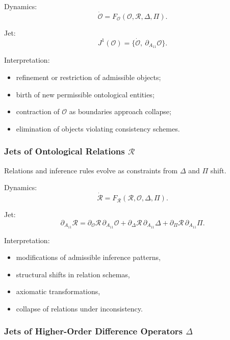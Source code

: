 Dynamics:
\[
\dot{\mathcal{O}}
=
F_{\mathcal{O}}(\mathcal{O},\mathcal{R},\Delta,\Pi).
\]

Jet:
\[
J^1(\mathcal{O})=\{\dot{\mathcal{O}},\ \partial_{A_{11}}\mathcal{O}\}.
\]

Interpretation:
\begin{itemize}
    \item refinement or restriction of admissible objects;
    \item birth of new permissible ontological entities;
    \item contraction of $\mathcal{O}$ as boundaries approach collapse;
    \item elimination of objects violating consistency schemes.
\end{itemize}


\subsubsection{Jets of Ontological Relations $\mathcal{R}$}

Relations and inference rules evolve as constraints from
$\Delta$ and $\Pi$ shift.

Dynamics:
\[
\dot{\mathcal{R}}
=
F_{\mathcal{R}}(\mathcal{R},\mathcal{O},\Delta,\Pi).
\]

Jet:
\[
\partial_{A_{11}}\mathcal{R}
=
\partial_{\mathcal{O}}\mathcal{R}\,\partial_{A_{11}}\mathcal{O}
+
\partial_{\Delta}\mathcal{R}\,\partial_{A_{11}}\Delta
+
\partial_{\Pi}\mathcal{R}\,\partial_{A_{11}}\Pi.
\]

Interpretation:
\begin{itemize}
    \item modifications of admissible inference patterns,
    \item structural shifts in relation schemas,
    \item axiomatic transformations,
    \item collapse of relations under inconsistency.
\end{itemize}


\subsubsection{Jets of Higher-Order Difference Operators \texorpdfstring{$\Delta$}{\Delta}}

